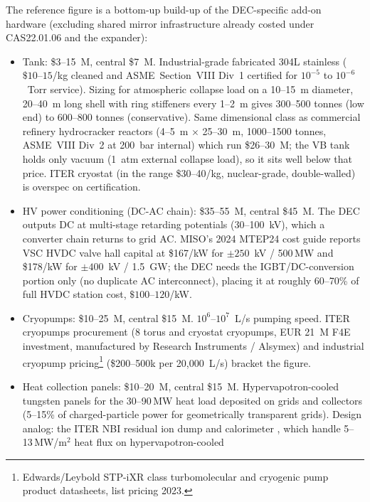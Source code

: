 \documentclass{article}
\begin{document}
The reference figure is a bottom-up build-up of the DEC-specific
add-on hardware (excluding shared mirror infrastructure already
costed under CAS22.01.06 and the expander):
\begin{itemize}
  \item Tank: \$3--15~M, central \$7~M.
    Industrial-grade fabricated 304L stainless ($\$10\text{--}15$/kg
    cleaned and ASME~Section~VIII Div~1 certified for $10^{-5}$ to
    $10^{-6}$~Torr service).  Sizing for atmospheric collapse load
    on a 10--15~m diameter, 20--40~m long shell with ring stiffeners
    every 1--2~m gives 300--500 tonnes (low end) to 600--800 tonnes
    (conservative). Same dimensional class as commercial refinery
    hydrocracker reactors \citep{exxonmobil_rotterdam_hydrocracker}
    (4--5~m $\times$ 25--30~m, 1000--1500 tonnes, ASME~VIII Div~2
    at 200~bar internal) which run \$26--30~M; the VB tank holds
    only vacuum (1~atm external collapse load), so it sits well
    below that price.  ITER cryostat (in the range \$30--40/kg,
    nuclear-grade, double-walled) is overspec on certification.
  \item HV power conditioning (DC-AC chain): \$35--55~M, central \$45~M.
    The DEC outputs DC at multi-stage retarding potentials (30--100~kV),
    which a converter chain returns to grid AC.  MISO's 2024 MTEP24
    cost guide \citep{miso2024mtep24} reports VSC HVDC valve hall
    capital at \$167/kW for $\pm 250$~kV / 500\,MW and \$178/kW for
    $\pm 400$~kV / 1.5~GW; the DEC needs the IGBT/DC-conversion
    portion only (no duplicate AC interconnect), placing it at
    roughly 60--70\% of full HVDC station cost, $\$100\text{--}120$/kW.
  \item Cryopumps: \$10--25~M, central \$15~M.
    $10^6$--$10^7$~L/s pumping speed.  ITER cryopumps procurement
    \citep{iter_cryopumps} (8 torus and cryostat cryopumps, EUR 21~M
    F4E investment, manufactured by Research Instruments / Alsymex)
    and industrial cryopump pricing\footnote{Edwards/Leybold STP-iXR class turbomolecular and cryogenic pump product datasheets, list pricing 2023.}
    (\$200--500k per 20{,}000~L/s) bracket the figure.
  \item Heat collection panels: \$10--20~M, central \$15~M.
    Hypervapotron-cooled tungsten panels for the 30--90\,MW heat
    load deposited on grids and collectors (5--15\% of charged-particle
    power for geometrically transparent grids).  Design analog: the
    ITER NBI residual ion dump and calorimeter \citep{hemsworth2017},
    which handle 5--13\,MW/m${}^2$ heat flux on hypervapotron-cooled

\end{itemize}
\end{document}
